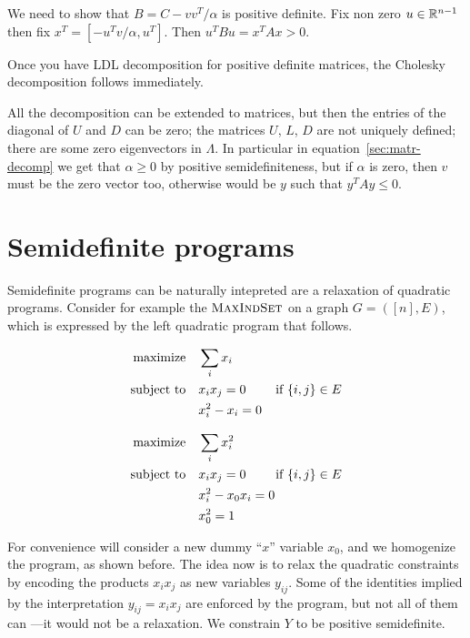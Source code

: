 \documentclass[a4paper,twoside,justified]{tufte-handout}
\begin{document}
We need to show that $B = C - vv^{T}/\alpha $ is positive definite. Fix
non zero $ u\in\mathbb{R}^{n-1} $ then fix $ x^{T}=[-u^{T}v/\alpha, u^{T}]
$. Then $ u^{T}Bu = x^{T}Ax > 0$.

Once you have LDL decomposition for positive definite matrices,
the Cholesky decomposition follows immediately.

All the decomposition can be extended to  matrices, but then the entries of the diagonal of $ U
$ and $D$ can be zero; the matrices $ U $, $ L $, $ D $ are not uniquely
defined; there are some zero eigenvectors in $ \Lambda $. In
particular in equation~\eqref{sec:matr-decomp} we get that $ \alpha
\geq 0 $ by positive semidefiniteness, but if $ \alpha $ is zero, then
$ v $ must be the zero vector too, otherwise would be $ y $ such that
$ y^{T}Ay \leq 0 $.

\section{Semidefinite programs}

Semidefinite programs can be naturally intepreted are a relaxation of
quadratic programs. Consider for example the $
\textsc{MaxIndSet} $ on a graph $ G=([n],E) $, which is
expressed by the left quadratic program that follows.

\begin{figure*}
\begin{minipage}[t]{0.5\textwidth}
\begin{alignat*}{2}\label{eq:maxindset1}
  \maximize \sum_{i}x_{i}\\
  \subjectto x_{i}x_{j} =0 \qquad \text{\ if $\{i,j\}\in E$}\\
  & x^{2}_{i} -x_{i}= 0
\end{alignat*}
\end{minipage}
\begin{minipage}[t]{0.5\textwidth}
\begin{alignat*}{2}
  \text{maximize}\hspace{1em}& \sum_{i}x^{2}_{i}\\
  \text{subject to}\hspace{1em}& x_{i}x_{j} =0 \qquad \text{\ if $\{i,j\}\in E$}\\
  & x^{2}_{i} -x_{0}x_{i} =0\\
  & x^{2}_{0} = 1
\end{alignat*}
\end{minipage}
\end{figure*}


For convenience will consider a new dummy ``$x$'' variable $ x_{0} $,
and we homogenize the program, as shown before. 
%
The idea now is to relax the quadratic constraints by encoding the
products $x_{i}x_{j} $ as new variables $ y_{ij} $. Some of the
identities implied by the interpretation $ y_{ij} = x_{i}x_{j} $ are
enforced by the program, but not all of them can ---it would not be a
relaxation. We constrain $Y$ to be positive semidefinite.
%
\end{document}
